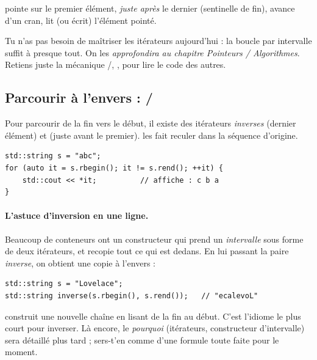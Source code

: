 \documentclass[11pt]{article}
\begin{document}
 pointe sur le premier élément,  \emph{juste après} le
dernier (sentinelle de fin),  avance d'un cran,  lit (ou
écrit) l'élément pointé.

\begin{aretenir}
Tu n'as pas besoin de maîtriser les itérateurs aujourd'hui : la boucle par
intervalle suffit à presque tout. On les \emph{approfondira au chapitre
Pointeurs / Algorithmes}. Retiens juste la mécanique /,
,  pour lire le code des autres.
\end{aretenir}

\subsection*{Parcourir à l'envers :  / }

Pour parcourir de la fin vers le début, il existe des itérateurs \emph{inverses}
 (dernier élément) et  (juste avant le premier).
\code{++} les fait reculer dans la séquence d'origine.

\begin{lstlisting}
std::string s = "abc";
for (auto it = s.rbegin(); it != s.rend(); ++it) {
    std::cout << *it;          // affiche : c b a
}
\end{lstlisting}

\paragraph{L'astuce d'inversion en une ligne.} Beaucoup de conteneurs ont un
constructeur qui prend un \emph{intervalle} \code{[debut, fin)} sous forme de
deux itérateurs, et recopie tout ce qui est dedans. En lui passant la paire
\emph{inverse}, on obtient une copie à l'envers :

\begin{lstlisting}
std::string s = "Lovelace";
std::string inverse(s.rbegin(), s.rend());   // "ecalevoL"
\end{lstlisting}

\begin{aretenir}
 construit une nouvelle chaîne en lisant
 de la fin au début. C'est l'idiome le plus court pour inverser. Là
encore, le \emph{pourquoi} (itérateurs, constructeur d'intervalle) sera détaillé
plus tard ; sers-t'en comme d'une formule toute faite pour le moment.
\end{aretenir}
\end{document}
